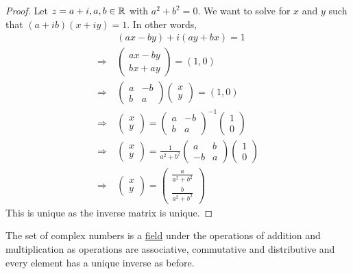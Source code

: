 \documentclass[11pt]{article}
\begin{document}
\begin{proof}
Let $z = a + i, a,b \in \mathbb{R}$ with $a^2 + b^2 = 0$. We want to solve for $x$ and
$y$ such that $(a + ib)(x + iy) = 1$. In other words,
\begin{align*}
&\> (ax - by) + i(ay + bx) = 1\\
\Rightarrow &\>
\begin{pmatrix}
ax - by \\ bx + ay
\end{pmatrix}
= (1,0)\\
\Rightarrow &\>
\begin{pmatrix}
a & -b\\
b & a
\end{pmatrix}
\begin{pmatrix}
x \\ y
\end{pmatrix}
= (1,0)\\
\Rightarrow &\>
\begin{pmatrix}
x \\ y
\end{pmatrix}
=
\begin{pmatrix}
a & -b\\
b & a
\end{pmatrix}^{-1}
\begin{pmatrix}
1 \\ 0
\end{pmatrix}\\
\Rightarrow &\>
\begin{pmatrix}
x \\ y
\end{pmatrix}
=
\frac{1}{a^2 + b^2}
\begin{pmatrix}
a & b\\
-b & a
\end{pmatrix}
\begin{pmatrix}
1 \\ 0
\end{pmatrix}\\
\Rightarrow &\>
\begin{pmatrix}
x \\ y
\end{pmatrix}
=
\begin{pmatrix}
\frac{a}{a^2 + b^2} \\ \frac{b}{a^2 + b^2}
\end{pmatrix}
\end{align*}
This is unique as the inverse matrix is unique.
\end{proof}
\begin{remark}
The set of complex numbers is a \underline{field} under the operations of
addition and multiplication as operations are associative, commutative
and distributive and every element has a unique inverse as before.
\end{remark}
\end{document}
